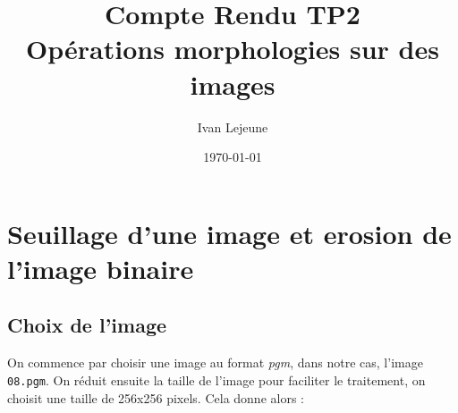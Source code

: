 \documentclass[french,a4paper,10pt]{article}
\title{Compte Rendu TP2\\Opérations morphologies sur des images}
\author{Ivan Lejeune}
\date{\today}
\begin{document}
	\maketitle

	\tableofcontents

	\newpage
	\section{Seuillage d'une image et erosion de l'image binaire}\label{sec:1}

	\subsection{Choix de l'image}\label{subsec:1.1}

	On commence par choisir une image au format \emph{pgm}, dans notre cas, l'image \texttt{08.pgm}.
	On réduit ensuite la taille de l'image pour faciliter le traitement, on choisit une taille de 256x256 pixels.
	Cela donne alors :
\end{document}
